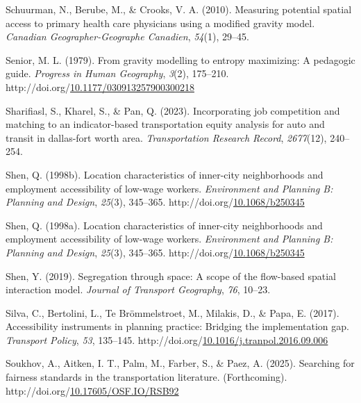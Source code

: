 \documentclass[
11pt, %
oneside, %
english, %
singlespacing, %
]{macthesis} %
\newlength{\cslhangindent}
\newenvironment{CSLReferences}[2] %
{\begin{list}{}{%
	\setlength{\itemindent}{0pt}
	\setlength{\leftmargin}{0pt}
	\setlength{\parsep}{0pt}
	\ifodd #1
	\setlength{\leftmargin}{\cslhangindent}
	\setlength{\itemindent}{-1\cslhangindent}
	\fi
	\setlength{\itemsep}{#2\baselineskip}}}
{\end{list}}
\begin{document}
\begin{CSLReferences}{1}{0}
Schuurman, N., Berube, M., \& Crooks, V. A. (2010). Measuring potential spatial access to primary health care physicians using a modified gravity model. \emph{Canadian Geographer-Geographe Canadien}, \emph{54}(1), 29--45.

Senior, M. L. (1979). From gravity modelling to entropy maximizing: A pedagogic guide. \emph{Progress in Human Geography}, \emph{3}(2), 175--210. http://doi.org/\href{https://doi.org/10.1177/030913257900300218}{10.1177/030913257900300218}

Sharifiasl, S., Kharel, S., \& Pan, Q. (2023). Incorporating job competition and matching to an indicator-based transportation equity analysis for auto and transit in dallas-fort worth area. \emph{Transportation Research Record}, \emph{2677}(12), 240--254.

Shen, Q. (1998b). Location characteristics of inner-city neighborhoods and employment accessibility of low-wage workers. \emph{Environment and Planning B: Planning and Design}, \emph{25}(3), 345--365. http://doi.org/\href{https://doi.org/10.1068/b250345}{10.1068/b250345}

Shen, Q. (1998a). Location characteristics of inner-city neighborhoods and employment accessibility of low-wage workers. \emph{Environment and Planning B: Planning and Design}, \emph{25}(3), 345--365. http://doi.org/\href{https://doi.org/10.1068/b250345}{10.1068/b250345}

Shen, Y. (2019). Segregation through space: A scope of the flow-based spatial interaction model. \emph{Journal of Transport Geography}, \emph{76}, 10--23.

Silva, C., Bertolini, L., Te Brömmelstroet, M., Milakis, D., \& Papa, E. (2017). Accessibility instruments in planning practice: Bridging the implementation gap. \emph{Transport Policy}, \emph{53}, 135--145. http://doi.org/\href{https://doi.org/10.1016/j.tranpol.2016.09.006}{10.1016/j.tranpol.2016.09.006}

Soukhov, A., Aitken, I. T., Palm, M., Farber, S., \& Paez, A. (2025). Searching for fairness standards in the transportation literature. (Forthcoming). http://doi.org/\href{https://doi.org/10.17605/OSF.IO/RSB92}{10.17605/OSF.IO/RSB92}


\end{CSLReferences}
\end{document}
